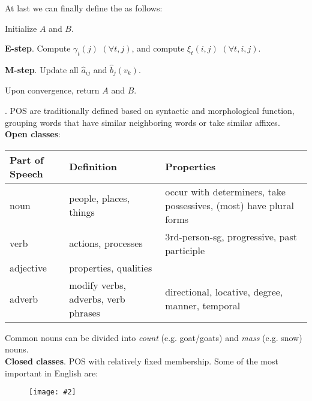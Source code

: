 \documentclass[11pt]{article}
\newcommand\myfig[2][0.3\textwidth]{\begin{figure}[h!]\centering\texttt{[image: \#2]}\end{figure}}
\newcommand\p{\Needspace{10\baselineskip} \noindent}
\begin{document}
At last we can finally define the  as follows:
\begin{compactenum}
	\item Initialize $A$ and $B$. 
	
	\item \textbf{E-step}. Compute $\gamma_t(j)$ $(\forall t, j)$, and compute $\xi_t(i, j)$ $(\forall t, i, j)$.
	
	\item \textbf{M-step}. Update all $\hat a_{ij}$ and $\hat b_j(v_k)$. 
	
	\item Upon convergence, return $A$ and $B$.
\end{compactenum}






\p {}. POS are traditionally defined based on syntactic and morphological function, grouping words that have similar neighboring words or take similar affixes. \\

\p \textbf{Open classes}:
\begin{tabular}{l | l | l}
	\textbf{Part of Speech} & \textbf{Definition} & \textbf{Properties} \\ \midrule
	noun & people, places, things & occur with determiners, take possessives, (most) have plural forms \\
	verb & actions, processes & 3rd-person-sg, progressive, past participle		\\
	adjective & properties, qualities &		\\
	adverb	& 	modify verbs, adverbs, verb phrases	& directional, locative, degree, manner, temporal \\
\end{tabular}
Common nouns can be divided into \textit{count} (e.g. goat/goats) and \textit{mass} (e.g. snow) nouns. \\

\p \textbf{Closed classes}. POS with relatively fixed membership. Some of the most important in English are:

\myfig{closed_classes.png}
\end{document}
